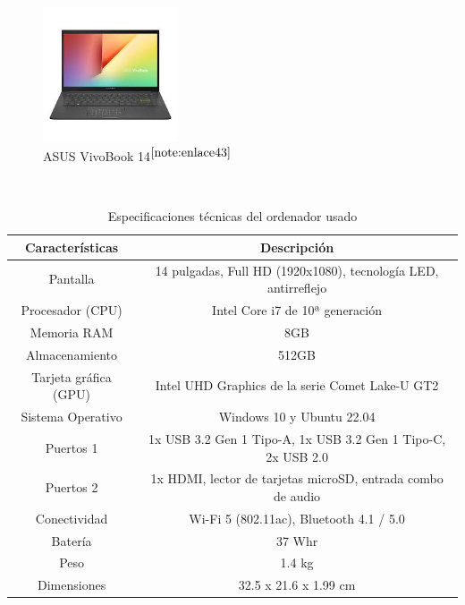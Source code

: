 \begin{figure} [h!]
	\begin{center}
		\includegraphics[width=4cm]{figs/ordenador.png}
	\end{center}
	\caption{ASUS VivoBook 14$^{\ref{note:enlace43}}$} 
	\label{fig:ordenador}
\end{figure}\

\setcounter{footnote}{43} %

\begin{table}[H]
	\begin{center}
		\begin{tabular}{|c|c|}
			\hline
			\textbf{Características} & \textbf{Descripción} \\
			\hline
			Pantalla & 14 pulgadas, Full HD (1920x1080), tecnología LED, antirreflejo \\
			Procesador (CPU) & Intel Core i7 de 10ª generación \\
			Memoria RAM & 8GB \\
			Almacenamiento & 512GB \\
			Tarjeta gráfica (GPU) & Intel UHD Graphics de la serie Comet Lake-U GT2 \\
			Sistema Operativo & Windows 10 y Ubuntu 22.04 \\
			Puertos 1 & 1x USB 3.2 Gen 1 Tipo-A, 1x USB 3.2 Gen 1 Tipo-C, 2x USB 2.0\\  
			Puertos 2 & 1x HDMI, lector de tarjetas microSD, entrada combo de audio \\
			Conectividad & 	Wi-Fi 5 (802.11ac), Bluetooth 4.1 / 5.0 \\
			Batería & 37 Whr \\
			Peso & 1.4 kg \\
			Dimensiones & 32.5 x 21.6 x 1.99 cm \\
			\hline
		\end{tabular}
		\caption{Especificaciones técnicas del ordenador usado}
		\label{cuadro:carac_ordena}
	\end{center}
\end{table}


